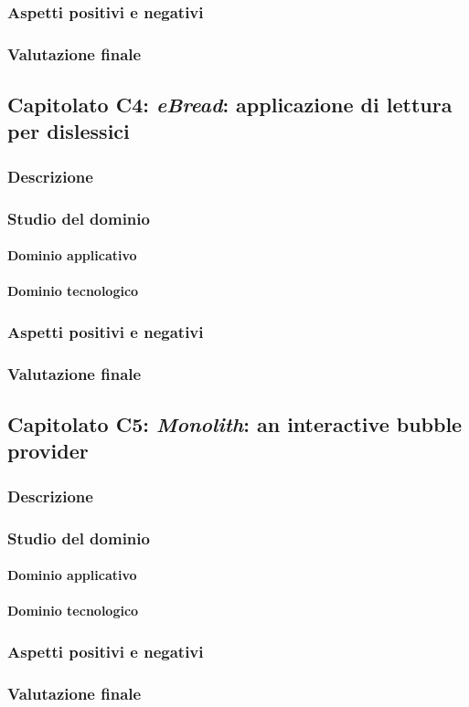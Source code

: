 		\subsubsection{Aspetti positivi e negativi}
		\subsubsection{Valutazione finale}
		
	\subsection{Capitolato C4: \emph{eBread}: applicazione di lettura per dislessici}
		\subsubsection{Descrizione}
		\subsubsection{Studio del dominio}
			\paragraph{Dominio applicativo}
			\paragraph{Dominio tecnologico}
		\subsubsection{Aspetti positivi e negativi}
		\subsubsection{Valutazione finale}
		
	\subsection{Capitolato C5: \emph{Monolith}: an interactive bubble provider}
		\subsubsection{Descrizione}
		\subsubsection{Studio del dominio}
			\paragraph{Dominio applicativo}
			\paragraph{Dominio tecnologico}
		\subsubsection{Aspetti positivi e negativi}
		\subsubsection{Valutazione finale}
		
